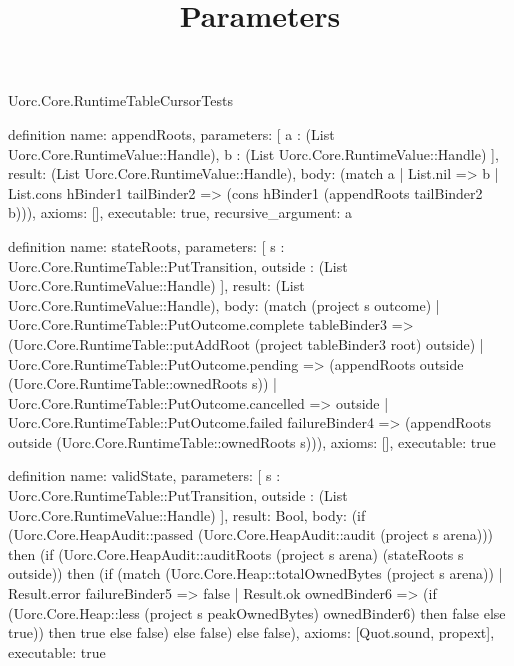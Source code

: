 \begin{lexlean}{Uorc.Core.RuntimeTableCursorTests}
\title{Parameters}
\begin{semanticmodule}
definition{
  name: appendRoots,
  parameters: [
    a : (List Uorc.Core.RuntimeValue::Handle),
    b : (List Uorc.Core.RuntimeValue::Handle)
  ],
  result: (List Uorc.Core.RuntimeValue::Handle),
  body: (match a
    | List.nil => b
    | List.cons hBinder1 tailBinder2 => (cons hBinder1 (appendRoots tailBinder2 b))),
  axioms: [],
  executable: true,
  recursive_argument: a
}

definition{
  name: stateRoots,
  parameters: [
    s : Uorc.Core.RuntimeTable::PutTransition,
    outside : (List Uorc.Core.RuntimeValue::Handle)
  ],
  result: (List Uorc.Core.RuntimeValue::Handle),
  body: (match (project s outcome)
    | Uorc.Core.RuntimeTable::PutOutcome.complete tableBinder3 => (Uorc.Core.RuntimeTable::putAddRoot (project tableBinder3 root) outside)
    | Uorc.Core.RuntimeTable::PutOutcome.pending => (appendRoots outside (Uorc.Core.RuntimeTable::ownedRoots s))
    | Uorc.Core.RuntimeTable::PutOutcome.cancelled => outside
    | Uorc.Core.RuntimeTable::PutOutcome.failed failureBinder4 => (appendRoots outside (Uorc.Core.RuntimeTable::ownedRoots s))),
  axioms: [],
  executable: true
}

definition{
  name: validState,
  parameters: [
    s : Uorc.Core.RuntimeTable::PutTransition,
    outside : (List Uorc.Core.RuntimeValue::Handle)
  ],
  result: Bool,
  body: (if (Uorc.Core.HeapAudit::passed (Uorc.Core.HeapAudit::audit (project s arena))) then (if (Uorc.Core.HeapAudit::auditRoots (project s arena) (stateRoots s outside)) then (if (match (Uorc.Core.Heap::totalOwnedBytes (project s arena))
    | Result.error failureBinder5 => false
    | Result.ok ownedBinder6 => (if (Uorc.Core.Heap::less (project s peakOwnedBytes) ownedBinder6) then false else true)) then true else false) else false) else false),
  axioms: [Quot.sound, propext],
  executable: true
}


\end{semanticmodule}
\end{lexlean}
